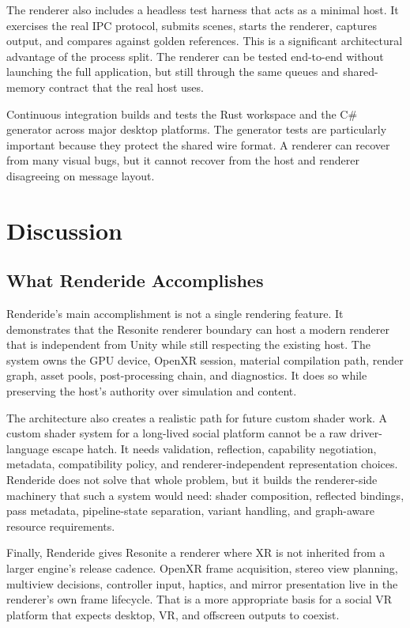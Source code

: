 \documentclass[acmtog,screen,nonacm]{acmart}
\begin{document}
The renderer also includes a headless test harness that acts as a minimal host. It exercises the real IPC protocol, submits scenes, starts the renderer, captures output, and compares against golden references. This is a significant architectural advantage of the process split. The renderer can be tested end-to-end without launching the full application, but still through the same queues and shared-memory contract that the real host uses.

Continuous integration builds and tests the Rust workspace and the C\# generator across major desktop platforms. The generator tests are particularly important because they protect the shared wire format. A renderer can recover from many visual bugs, but it cannot recover from the host and renderer disagreeing on message layout.

\section{Discussion}

\subsection{What Renderide Accomplishes}

Renderide's main accomplishment is not a single rendering feature. It demonstrates that the Resonite renderer boundary can host a modern renderer that is independent from Unity while still respecting the existing host. The system owns the GPU device, OpenXR session, material compilation path, render graph, asset pools, post-processing chain, and diagnostics. It does so while preserving the host's authority over simulation and content.

The architecture also creates a realistic path for future custom shader work. A custom shader system for a long-lived social platform cannot be a raw driver-language escape hatch. It needs validation, reflection, capability negotiation, metadata, compatibility policy, and renderer-independent representation choices. Renderide does not solve that whole problem, but it builds the renderer-side machinery that such a system would need: shader composition, reflected bindings, pass metadata, pipeline-state separation, variant handling, and graph-aware resource requirements.

Finally, Renderide gives Resonite a renderer where XR is not inherited from a larger engine's release cadence. OpenXR frame acquisition, stereo view planning, multiview decisions, controller input, haptics, and mirror presentation live in the renderer's own frame lifecycle. That is a more appropriate basis for a social VR platform that expects desktop, VR, and offscreen outputs to coexist.
\end{document}
